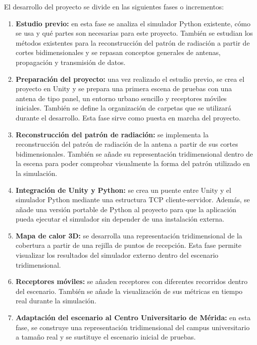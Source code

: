 El desarrollo del proyecto se divide en las siguientes fases o incrementos:

\begin{enumerate}
    \item \textbf{Estudio previo:} en esta fase se analiza el simulador Python existente, cómo se usa y qué partes son necesarias para este proyecto. También se estudian los métodos existentes para la reconstrucción del patrón de radiación a partir de cortes bidimensionales y se repasan conceptos generales de antenas, propagación y transmisión de datos.

    \item \textbf{Preparación del proyecto:} una vez realizado el estudio previo, se crea el proyecto en Unity y se prepara una primera escena de pruebas con una antena de tipo panel, un entorno urbano sencillo y receptores móviles iniciales. También se define la organización de carpetas que se utilizará durante el desarrollo. Esta fase sirve como puesta en marcha del proyecto.

    \item \textbf{Reconstrucción del patrón de radiación:} se implementa la reconstrucción del patrón de radiación de la antena a partir de sus cortes bidimensionales. También se añade su representación tridimensional dentro de la escena para poder comprobar visualmente la forma del patrón utilizado en la simulación.

    \item \textbf{Integración de Unity y Python:} se crea un puente entre Unity y el simulador Python mediante una estructura TCP cliente-servidor. Además, se añade una versión portable de Python al proyecto para que la aplicación pueda ejecutar el simulador sin depender de una instalación externa.

    \item \textbf{Mapa de calor 3D:} se desarrolla una representación tridimensional de la cobertura a partir de una rejilla de puntos de recepción. Esta fase permite visualizar los resultados del simulador externo dentro del escenario tridimensional.

    \item \textbf{Receptores móviles:} se añaden receptores con diferentes recorridos dentro del escenario. También se añade la visualización de sus métricas en tiempo real durante la simulación.

    \item \textbf{Adaptación del escenario al Centro Universitario de Mérida:} en esta fase, se construye una representación tridimensional del campus universitario a tamaño real y se sustituye el escenario inicial de pruebas.


\end{enumerate}
